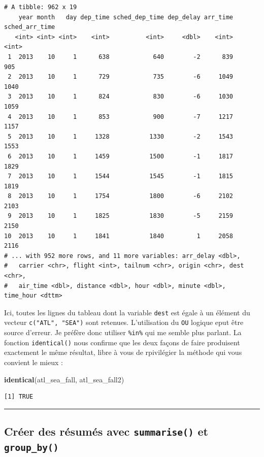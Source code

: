 \documentclass[a4paperpaper,]{article}
\newenvironment{Shaded}{\begin{snugshade}}{\end{snugshade}}
\newcommand{\KeywordTok}[1]{\textcolor[rgb]{0.12,0.11,0.11}{\textbf{#1}}}
\newcommand{\NormalTok}[1]{\textcolor[rgb]{0.12,0.11,0.11}{#1}}
\theoremstyle{definition}
\theoremstyle{definition}
\theoremstyle{definition}
\theoremstyle{remark}
\begin{document}
\begin{verbatim}
# A tibble: 962 x 19
    year month   day dep_time sched_dep_time dep_delay arr_time sched_arr_time
   <int> <int> <int>    <int>          <int>     <dbl>    <int>          <int>
 1  2013    10     1      638            640        -2      839            905
 2  2013    10     1      729            735        -6     1049           1040
 3  2013    10     1      824            830        -6     1030           1059
 4  2013    10     1      853            900        -7     1217           1157
 5  2013    10     1     1328           1330        -2     1543           1553
 6  2013    10     1     1459           1500        -1     1817           1829
 7  2013    10     1     1544           1545        -1     1815           1819
 8  2013    10     1     1754           1800        -6     2102           2103
 9  2013    10     1     1825           1830        -5     2159           2150
10  2013    10     1     1841           1840         1     2058           2116
# ... with 952 more rows, and 11 more variables: arr_delay <dbl>,
#   carrier <chr>, flight <int>, tailnum <chr>, origin <chr>, dest <chr>,
#   air_time <dbl>, distance <dbl>, hour <dbl>, minute <dbl>, time_hour <dttm>
\end{verbatim}

Ici, toutes les lignes du tableau dont la variable \texttt{dest} est
égale à un élément du vecteur \texttt{c("ATL",\ "SEA")} sont retenues.
L'utilisation du \texttt{OU} logique eput être source d'erreur. Je
préfère donc utiliser \texttt{\%in\%} qui me semble plus parlant. La
fonction \texttt{identical()} nous confirme que les deux façons de faire
produisent exactement le même résultat, libre à vous de rpivilégier la
méthode qui vous convient le mieux :

\begin{Shaded}
\begin{Highlighting}[]
\KeywordTok{identical}\NormalTok{(atl_sea_fall, atl_sea_fall2)}
\end{Highlighting}
\end{Shaded}

\begin{verbatim}
[1] TRUE
\end{verbatim}

\begin{center}\rule{0.5\linewidth}{\linethickness}\end{center}

\hypertarget{creer-des-resumes-avec-summarise-et-group_by}{%
\subsection{\texorpdfstring{Créer des résumés avec \texttt{summarise()}
et
\texttt{group\_by()}}{Créer des résumés avec summarise() et group\_by()}}\label{creer-des-resumes-avec-summarise-et-group_by}}
\end{document}
